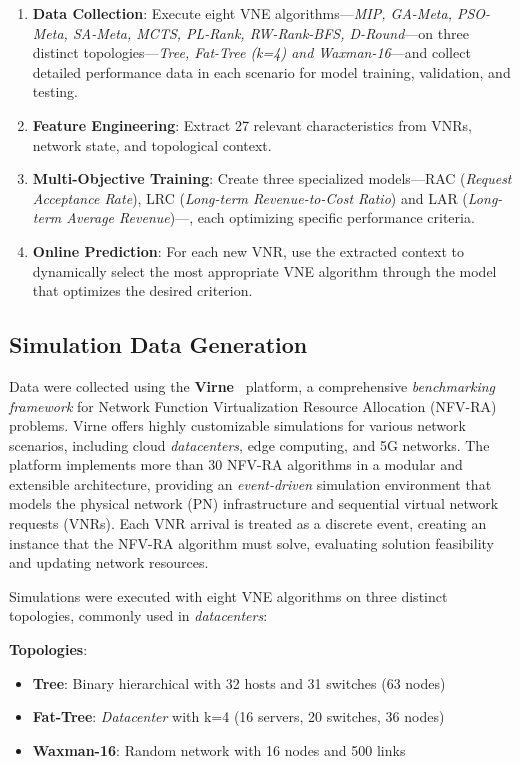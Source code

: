 \documentclass[conference]{IEEEtran}
\begin{document}
\begin{enumerate}
    \item \textbf{Data Collection}: Execute eight VNE algorithms---\textit{MIP, GA-Meta, PSO-Meta, SA-Meta, MCTS, PL-Rank, RW-Rank-BFS, D-Round}---on three distinct topologies---\textit{Tree, Fat-Tree (k=4) and Waxman-16}---and collect detailed performance data in each scenario for model training, validation, and testing.
    \item \textbf{Feature Engineering}: Extract 27 relevant characteristics from VNRs, network state, and topological context.
    \item \textbf{Multi-Objective Training}: Create three specialized models---RAC (\textit{Request Acceptance Rate}), LRC (\textit{Long-term Revenue-to-Cost Ratio}) and LAR (\textit{Long-term Average Revenue})---, each optimizing specific performance criteria.
    \item \textbf{Online Prediction}: For each new VNR, use the extracted context to dynamically select the most appropriate VNE algorithm through the model that optimizes the desired criterion.
\end{enumerate}

\subsection{Simulation Data Generation}

Data were collected using the \textbf{Virne}~\cite{wang2024virne} platform, a comprehensive \textit{benchmarking} \textit{framework} for Network Function Virtualization Resource Allocation (NFV-RA) problems. Virne offers highly customizable simulations for various network scenarios, including cloud \textit{datacenters}, edge computing, and 5G networks. The platform implements more than 30 NFV-RA algorithms in a modular and extensible architecture, providing an \textit{event-driven} simulation environment that models the physical network (PN) infrastructure and sequential virtual network requests (VNRs). Each VNR arrival is treated as a discrete event, creating an instance that the NFV-RA algorithm must solve, evaluating solution feasibility and updating network resources.

Simulations were executed with eight VNE algorithms on three distinct topologies, commonly used in \textit{datacenters}:

\textbf{Topologies}:
\begin{itemize}
    \item \textbf{Tree}: Binary hierarchical with 32 hosts and 31 switches (63 nodes)
    \item \textbf{Fat-Tree}: \textit{Datacenter} with k=4 (16 servers, 20 switches, 36 nodes)
    \item \textbf{Waxman-16}: Random network with 16 nodes and 500 links
\end{itemize}
\end{document}
